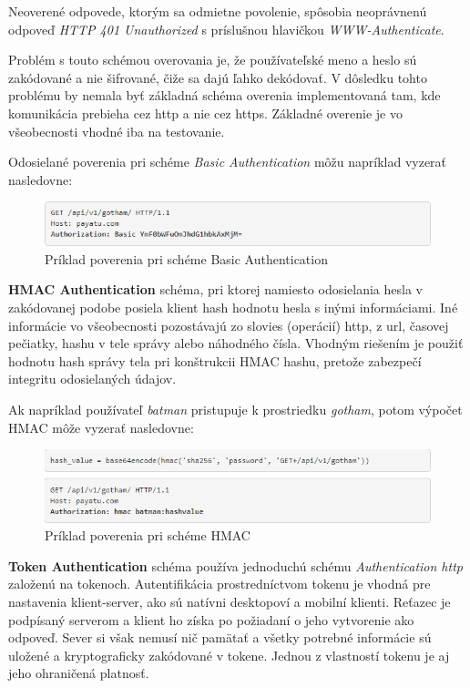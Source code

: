 Neoverené odpovede, ktorým sa odmietne povolenie, spôsobia neoprávnenú odpoveď
\textit{HTTP 401 Unauthorized} s príslušnou hlavičkou \textit{WWW-Authenticate}.

Problém s touto schémou overovania je, že používateľské meno a heslo sú zakódované a nie šifrované,
čiže sa dajú ľahko dekódovať. V dôsledku tohto problému by nemala byť základná schéma overenia
implementovaná tam, kde komunikácia prebieha cez \acrshort{http} a nie cez \acrshort{https}.
Základné overenie je vo všeobecnosti vhodné iba na testovanie.

Odosielané poverenia pri schéme \textit{Basic Authentication} môžu napríklad vyzerať nasledovne:
\begin{figure}[ht]
  \centering
  \includegraphics[width=1\columnwidth]{img/auth_basic.png}
  \caption{\label{fig:auth_basic} Príklad poverenia pri schéme Basic Authentication \cite{payatu}}
\end{figure}


\textbf{HMAC Authentication} schéma, pri ktorej namiesto odosielania hesla v zakódovanej podobe
posiela klient hash hodnotu hesla s inými informáciami. Iné informácie vo všeobecnosti pozostávajú
zo slovies (operácií) \acrshort{http}, z \acrshort{url}, časovej pečiatky, hashu v tele správy alebo náhodného čísla.
Vhodným riešením je použiť hodnotu hash správy tela pri konštrukcii HMAC hashu, pretože zabezpečí
integritu odosielaných údajov.

Ak napríklad používateľ \textit{batman} pristupuje k prostriedku \textit{gotham}, potom výpočet HMAC môže vyzerať
nasledovne:
\begin{figure}[ht]
  \centering
  \includegraphics[width=1\columnwidth]{img/auth_hmac.png}
  \caption{\label{fig:auth_hmac} Príklad poverenia pri schéme HMAC \cite{payatu}}
\end{figure}


\textbf{Token Authentication} schéma používa jednoduchú schému \textit{Authentication \acrshort{http}} založenú na tokenoch.
Autentifikácia prostredníctvom tokenu je vhodná pre nastavenia klient-server, ako sú natívni desktopoví
a mobilní klienti. Reťazec je podpísaný serverom a klient ho získa po požiadaní o jeho vytvorenie ako odpoveď.
Sever si však nemusí nič pamätať a všetky potrebné informácie sú uložené a kryptograficky zakódované v tokene.
Jednou z vlastností tokenu je aj jeho ohraničená platnosť.

